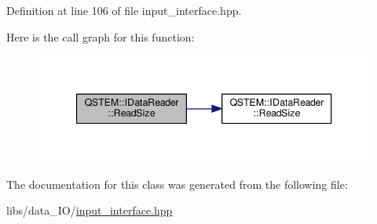 Definition at line 106 of file input\-\_\-interface.\-hpp.



Here is the call graph for this function\-:
\nopagebreak
\begin{figure}[H]
\begin{center}
\leavevmode
\includegraphics[width=344pt]{class_q_s_t_e_m_1_1_i_data_reader_ac33378e031385c2d2828cb7326012aef_cgraph}
\end{center}
\end{figure}




The documentation for this class was generated from the following file\-:\begin{DoxyCompactItemize}
\item 
libs/data\-\_\-\-I\-O/\hyperlink{input__interface_8hpp}{input\-\_\-interface.\-hpp}\end{DoxyCompactItemize}
